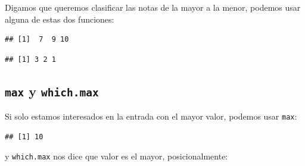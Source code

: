 \documentclass[
]{book}
\newenvironment{Shaded}{\begin{snugshade}}{\end{snugshade}}
\newcommand{\FunctionTok}[1]{\textcolor[rgb]{0.13,0.29,0.53}{\textbf{#1}}}
\newcommand{\NormalTok}[1]{#1}
\newcommand{\SpecialCharTok}[1]{\textcolor[rgb]{0.81,0.36,0.00}{\textbf{#1}}}
\begin{document}
Digamos que queremos clasificar las notas de la mayor a la menor, podemos usar alguna de estas dos funciones:

\begin{Shaded}
\end{Shaded}

\begin{verbatim}
## [1]  7  9 10
\end{verbatim}

\begin{Shaded}
\end{Shaded}

\begin{verbatim}
## [1] 3 2 1
\end{verbatim}

\subsection{\texorpdfstring{\texttt{max} y \texttt{which.max}}{max y which.max}}\label{max-y-which.max}

Si solo estamos interesados en la entrada con el mayor valor, podemos usar \texttt{max}:

\begin{Shaded}
\end{Shaded}

\begin{verbatim}
## [1] 10
\end{verbatim}

y \texttt{which.max} nos dice que valor es el mayor, posicionalmente:

\begin{Shaded}
\end{Shaded}
\end{document}
